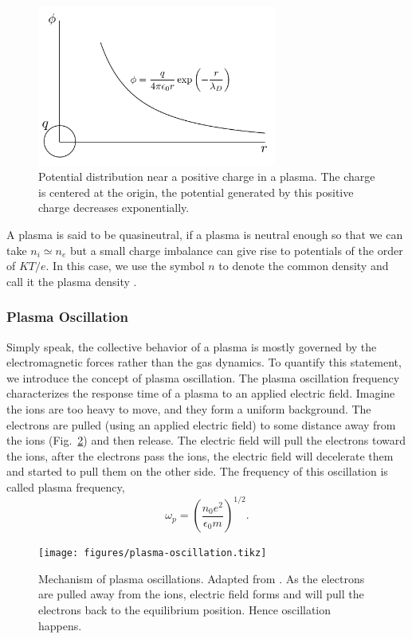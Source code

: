 \begin{figure}[htbp]
	\centering
	\includegraphics[width=0.7\textwidth]{figures/debye-potential.png}
	\caption{Potential distribution near a positive charge in a plasma. The charge is centered at the origin, the potential generated by this positive charge decreases exponentially.}
	\label{fig:debye-potential}
\end{figure}

A plasma is said to be quasineutral, if a plasma is neutral enough so that we can take $n_i \simeq n_e$ but a small charge imbalance can give rise to potentials of the order of $KT/e$. In this case, we use the symbol $n$ to denote the common density and call it the plasma density \cite{chen_introduction_2016}.

\subsubsection*{Plasma Oscillation}
Simply speak, the collective behavior of a plasma is mostly governed by the electromagnetic forces rather than the gas dynamics. To quantify this statement, we introduce the concept of plasma oscillation.
The plasma oscillation frequency characterizes the response time of a plasma to an applied electric field. Imagine the ions are too heavy to move, and they form a uniform background. The electrons are pulled (using an applied electric field) to some distance away from the ions (Fig.~\ref{fig:plasma-oscillation}) and then release. The electric field will pull the electrons toward the ions, after the electrons pass the ions, the electric field will decelerate them and started to pull them on the other side. The frequency of this oscillation is called plasma frequency,
\begin{equation}
	\omega_p = \left(\frac{n_0e^2}{\epsilon_0m}\right)^{1/2}.
\end{equation}

\begin{figure}[htbp]
	\centering
	\texttt{[image: figures/plasma-oscillation.tikz]}
	\caption{Mechanism of plasma oscillations. Adapted from \cite{chen_introduction_2016}. As the electrons are pulled away from the ions, electric field forms and will pull the electrons back to the equilibrium position. Hence oscillation happens.}
	\label{fig:plasma-oscillation}
\end{figure}


